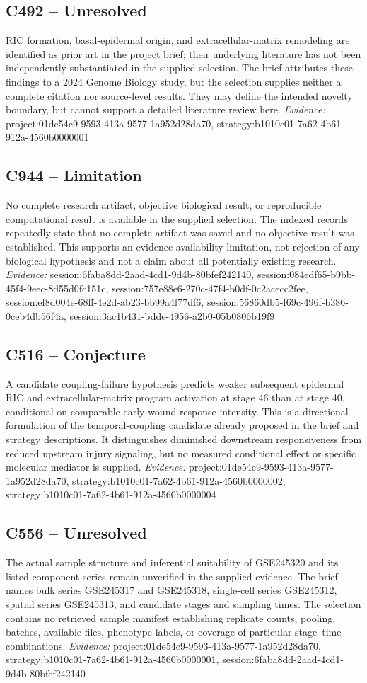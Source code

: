 \documentclass[11pt]{article}
\begin{document}
\subsection{C492 -- Unresolved}
RIC formation, basal-epidermal origin, and extracellular-matrix remodeling are identified as prior art in the project brief; their underlying literature has not been independently substantiated in the supplied selection.
The brief attributes these findings to a 2024 Genome Biology study, but the selection supplies neither a complete citation nor source-level results. They may define the intended novelty boundary, but cannot support a detailed literature review here.
\textit{Evidence: }project:01de54c9-9593-413a-9577-1a952d28da70, strategy:b1010c01-7a62-4b61-912a-4560b0000001
\subsection{C944 -- Limitation}
No complete research artifact, objective biological result, or reproducible computational result is available in the supplied selection.
The indexed records repeatedly state that no complete artifact was saved and no objective result was established. This supports an evidence-availability limitation, not rejection of any biological hypothesis and not a claim about all potentially existing research.
\textit{Evidence: }session:6faba8dd-2aad-4cd1-9d4b-80bfef242140, session:084edf65-b9bb-45f4-9eec-8d55d0fc151c, session:757e88e6-270c-47f4-b0df-0c2acecc2fee, session:ef8d004e-68ff-4e2d-ab23-bb99a4f77df6, session:56860db5-f69c-496f-b386-0ceb4db56f4a, session:3ac1b431-bdde-4956-a2b0-05b0806b19f9
\subsection{C516 -- Conjecture}
A candidate coupling-failure hypothesis predicts weaker subsequent epidermal RIC and extracellular-matrix program activation at stage 46 than at stage 40, conditional on comparable early wound-response intensity.
This is a directional formulation of the temporal-coupling candidate already proposed in the brief and strategy descriptions. It distinguishes diminished downstream responsiveness from reduced upstream injury signaling, but no measured conditional effect or specific molecular mediator is supplied.
\textit{Evidence: }project:01de54c9-9593-413a-9577-1a952d28da70, strategy:b1010c01-7a62-4b61-912a-4560b0000002, strategy:b1010c01-7a62-4b61-912a-4560b0000004
\subsection{C556 -- Unresolved}
The actual sample structure and inferential suitability of GSE245320 and its listed component series remain unverified in the supplied evidence.
The brief names bulk series GSE245317 and GSE245318, single-cell series GSE245312, spatial series GSE245313, and candidate stages and sampling times. The selection contains no retrieved sample manifest establishing replicate counts, pooling, batches, available files, phenotype labels, or coverage of particular stage–time combinations.
\textit{Evidence: }project:01de54c9-9593-413a-9577-1a952d28da70, strategy:b1010c01-7a62-4b61-912a-4560b0000001, session:6faba8dd-2aad-4cd1-9d4b-80bfef242140
\end{document}
